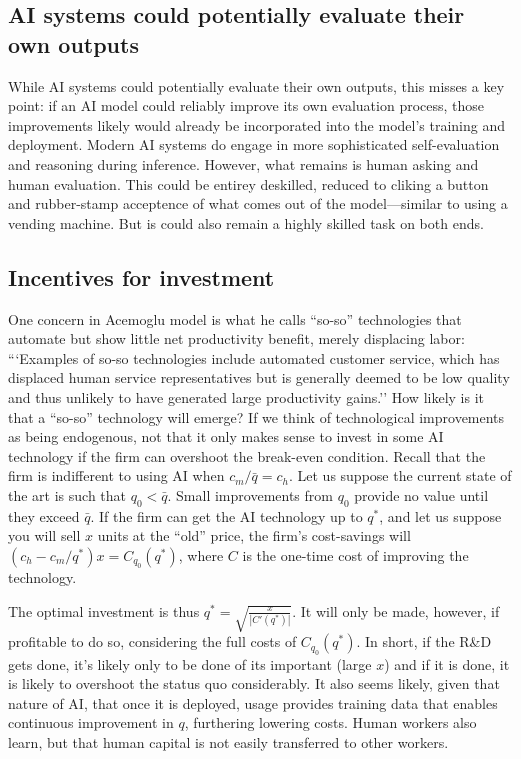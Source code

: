 \documentclass{article}
\theoremstyle{plain}
\theoremstyle{plain}
\begin{document}
\subsection{AI systems could potentially evaluate their own outputs}
While AI systems could potentially evaluate their own outputs, this misses a key point: if an AI model could reliably improve its own evaluation process, those improvements likely would already be incorporated into the model's training and deployment.
Modern AI systems do engage in more sophisticated self-evaluation and reasoning during inference. 
However, what remains is human asking and human evaluation.
This could be entirey deskilled, reduced to cliking a button and rubber-stamp acceptence of what comes out of the model---similar to using a vending machine.
But is could also remain a highly skilled task on both ends.

\subsection{Incentives for investment}
One concern in Acemoglu model is what he calls ``so-so'' technologies that automate but show little net productivity benefit, merely displacing labor: ```Examples of so-so technologies include automated customer service, which has displaced human service representatives but is generally deemed to be low quality and thus unlikely to have generated large productivity gains.''
How likely is it that a ``so-so'' technology will emerge?
If we think of technological improvements as being endogenous, not that it only makes sense to invest in some AI technology if the firm can overshoot the break-even condition. 
Recall that the firm is indifferent to using AI when $c_m / \bar{q} = c_h$. 
Let us suppose the current state of the art is such that $q_0 < \bar{q}$.
Small improvements from $q_0$ provide no value until they exceed $\bar{q}$. 
If the firm can get the AI technology up to $q^*$, and let us suppose you will sell $x$ units at the ``old'' price, 
the firm's cost-savings will $(c_h - c_m / q^*) x = C_{q_0}(q^*)$, where $C$ is the one-time cost of improving the technology.

The optimal investment is thus $q^* = \sqrt{\frac{x}{|C'(q^*)|}}$.
It will only be made, however, if profitable to do so, considering the full costs of $C_{q_0}(q^*)$.
In short, if the R\&D gets done, it's likely only to be done of its important (large $x$) and if it is done, it is likely to overshoot the status quo considerably.  
It also seems likely, given that nature of AI, that once it is deployed, usage provides training data that enables continuous improvement in $q$, furthering lowering costs. 
Human workers also learn, but that human capital is not easily transferred to other workers. 
\end{document}
